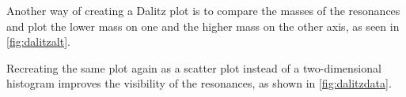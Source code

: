 Another way of creating a Dalitz plot is to compare the masses of the resonances 
and plot the lower mass on one and the higher mass on the other axis, as seen in \autoref{fig:dalitzalt}.


Recreating the same plot again as a scatter plot instead of a two-dimensional histogram 
improves the visibility of the resonances, as shown in \autoref{fig:dalitzdata}.


